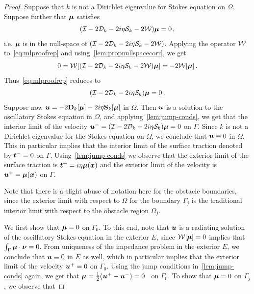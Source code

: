 \begin{proof}
Suppose that $k$ is not a Dirichlet eigenvalue for Stokes equation on
$\Omega$. 
Suppose further that ${\boldsymbol \mu}$ satisfies
\begin{equation}
(\mathcal I - 2{\mathcal D}_{k} -2i\eta{\mathcal S}_{k} - 2{\mathcal W}) {\boldsymbol \mu} = 0 \, , \label{eq:mlproofrep}
\end{equation}
i.e. ${\boldsymbol \mu}$ is in the null-space
of $(\mathcal I - 2 {\mathcal D}_{k} - 2i\eta {\mathcal S}_{k} - 2 {\mathcal W})$. 
Applying the operator ${\mathcal W}$ to~\cref{eq:mlproofrep} and 
using~\cref{lem:propnullspacecorr}, we get
\begin{equation}
0 = {\mathcal W} [(\mathcal I - 2{\mathcal D}_{k} - 2i\eta{\mathcal S}_{k} - 2{\mathcal W}){\boldsymbol \mu}] = -2{\mathcal W} [{\boldsymbol \mu}] \, .
\end{equation}
Thus~\cref{eq:mlproofrep} reduces to
\begin{equation}
(\mathcal I - 2 {\mathcal D}_{k} - 2i\eta {\mathcal S}_{k}){\boldsymbol \mu} = 0\, .
\end{equation}
Suppose now ${\boldsymbol u} = -2{\bf D}_{k}[{\boldsymbol \mu}] -2i\eta{\bf S}_{k}[{\boldsymbol \mu}]$ in $\Omega$.
Then ${\boldsymbol u}$ is a solution to the oscillatory Stokes equation in $\Omega$,
and applying~\cref{lem:jump-conds}, we get that the interior
limit of the velocity ${\boldsymbol u}^{-} = (\mathcal I - 2{\mathcal D}_{k} -2i\eta{\mathcal S}_{k}) {\boldsymbol \mu} = 0$ on $\Gamma$. 
Since $k$ is not a Dirichlet eigenvalue for the Stokes equation on 
$\Omega$, we conclude that ${\boldsymbol u} \equiv 0$ in $\Omega$. 
This in particular implies that the interior limit of the surface traction
denoted by ${\boldsymbol t}^{-} = 0$ on $\Gamma$.
Using~\cref{lem:jump-conds}  
we observe that the exterior limit 
of the surface traction is ${\boldsymbol t}^{+} = i\eta {\boldsymbol \mu}({\boldsymbol x})$
and the exterior limit of the velocity is 
${\boldsymbol u}^{+} = {\boldsymbol \mu}({\boldsymbol x})$ on $\Gamma$.
\begin{remark}
Note that there is a slight abuse of notation here for the obstacle
boundaries, since the exterior limit with respect to $\Omega$ 
for the boundary $\Gamma_{j}$ is the traditional interior 
limit with respect to the obstacle region $\Omega_{j}$.
\end{remark}
We first show that ${\boldsymbol \mu}=0$ on $\Gamma_{0}$. 
To this end, note that ${\boldsymbol u}$ is a radiating solution of the oscillatory
Stokes equation in the exterior $E$,
since ${\mathcal W}[{\boldsymbol \mu}] = 0$ implies that $\int_{\Gamma} {\boldsymbol \mu} \cdot {\boldsymbol \nu} = 0$. 
From uniqueness of the impedance problem in the exterior $E$, we conclude
that ${\boldsymbol u} \equiv 0$ in $E$ as well, which in particular implies that
the exterior limit of the velocity ${\boldsymbol u}^{+}=0$ on $\Gamma_{0}$.   
Using the jump conditions in~\cref{lem:jump-conds} again, we
get that ${\boldsymbol \mu} = \frac{1}{2}({\boldsymbol u}^{+} - {\boldsymbol u}^{-}) = 0$ \, on
$\Gamma_{0}$. 
To show that ${\boldsymbol \mu}=0$ on $\Gamma_{j}$, we observe that

\end{proof}
